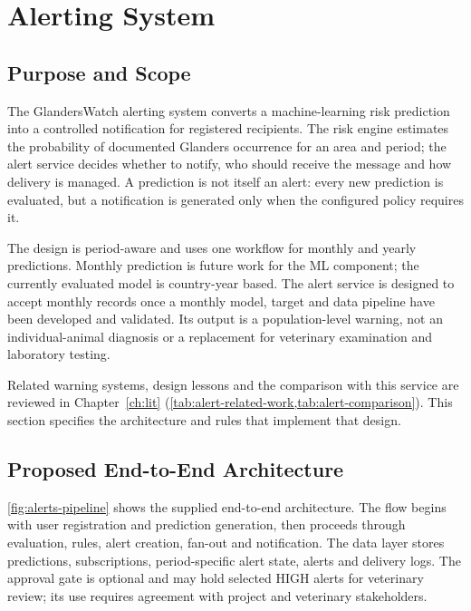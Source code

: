 \documentclass[10pt,openany]{report}
\begin{document}

\section{Alerting System}
\label{ch:alerts}

\subsection{Purpose and Scope}
The GlandersWatch alerting system converts a machine-learning risk prediction into a controlled notification for registered recipients. The risk engine estimates the probability of documented Glanders occurrence for an area and period; the alert service decides whether to notify, who should receive the message and how delivery is managed. A prediction is not itself an alert: every new prediction is evaluated, but a notification is generated only when the configured policy requires it.

The design is period-aware and uses one workflow for monthly and yearly predictions. Monthly prediction is future work for the ML component; the currently evaluated model is country-year based. The alert service is designed to accept monthly records once a monthly model, target and data pipeline have been developed and validated. Its output is a population-level warning, not an individual-animal diagnosis or a replacement for veterinary examination and laboratory testing.

Related warning systems, design lessons and the comparison with this service are reviewed in
Chapter~\ref{ch:lit} (\cref{tab:alert-related-work,tab:alert-comparison}). This
section specifies the architecture and rules that implement that design.

\subsection{Proposed End-to-End Architecture}
\cref{fig:alerts-pipeline} shows the supplied end-to-end architecture. The flow begins with user registration and prediction generation, then proceeds through evaluation, rules, alert creation, fan-out and notification. The data layer stores predictions, subscriptions, period-specific alert state, alerts and delivery logs. The approval gate is optional and may hold selected HIGH alerts for veterinary review; its use requires agreement with project and veterinary stakeholders.
\end{document}
